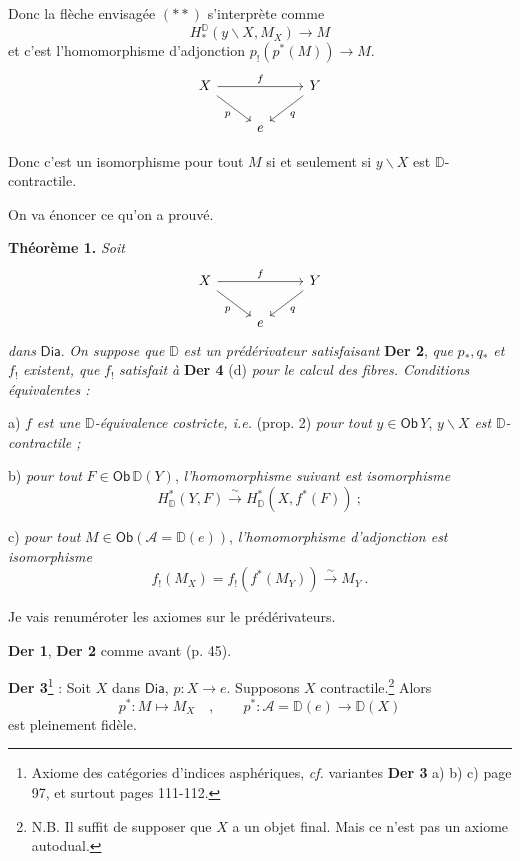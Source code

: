 \documentclass[11pt]{article}
\newcommand{\printedpage}[1]{\marginpar{\footnotesize p.~#1}}
\newcommand{\msp}[1]{\marginpar{\footnotesize [#1]}}
\newcommand{\D}{\mathbb{D}}
\newcommand{\Dia}{\mathsf{Dia}}
\newcommand{\Ob}{\mathsf{Ob}}
\newcommand{\isoto}{\overset{\sim}{\longrightarrow}}
\begin{document}
\printedpage{39}
\msp{page 67}

\noindent Donc la flèche envisagée $(**)$ s'interprète comme
\[
H_*^{\D}(y\backslash X, M_X) \longrightarrow M
\]
et c'est l'homomorphisme d'adjonction $p_!(p^*(M)) \to M$.
\[
\begin{tikzcd}
X \arrow[rr, "f"] \arrow[dr, "p"{swap}] & & Y \arrow[dl, "q"] \\
& e &
\end{tikzcd}
\]

\noindent Donc c'est un isomorphisme pour tout $M$ si et seulement si $y\backslash X$ est $\D$-contractile.

\noindent On va énoncer ce qu'on a prouvé.

\noindent\textbf{Théorème 1.} \textit{Soit}
\[
\begin{tikzcd}
X \arrow[rr, "f"] \arrow[dr, "p"{swap}] & & Y \arrow[dl, "q"] \\
& e &
\end{tikzcd}
\]
\textit{dans} $\Dia$. \textit{On suppose que} $\D$ \textit{est un prédérivateur satisfaisant} \textbf{Der 2}, \textit{que} $p_*, q_*$ \textit{et} $f_!$ \textit{existent, que} $f_!$ \textit{satisfait à} \textbf{Der 4} (d) \textit{pour le calcul des fibres. Conditions équivalentes :}

a) $f$ \textit{est une} $\D$\textit{-équivalence costricte, i.e.} (prop. 2) \textit{pour tout} $y \in \Ob\, Y$, $y\backslash X$ \textit{est} $\D$\textit{-contractile ;}

b) \textit{pour tout} $F \in \Ob\, \D(Y)$, \textit{l'homomorphisme suivant est} \textit{isomorphisme}
\[
H^*_{\D}(Y, F) \isoto H^*_{\D}(X, f^*(F)) \ ;
\]

c) \textit{pour tout} $M \in \Ob(\mathcal{A} = \D(e))$, \textit{l'homomorphisme d'adjonction est} \textit{isomorphisme}
\[
f_!(M_X) = f_!(f^*(M_Y)) \isoto M_Y \ .
\]

Je vais renuméroter les axiomes sur le prédérivateurs. %

\noindent\textbf{Der 1}, \textbf{Der 2} comme avant (p. 45).

\noindent\textbf{Der 3}\footnote[28]{Axiome des catégories d'indices asphériques, \textit{cf.} variantes \textbf{Der 3} a) b) c) page 97, et surtout pages 111-112.} : Soit $X$ dans $\Dia$, $p : X \to e$. Supposons $X$ contractile.\footnote[29]{N.B. Il suffit de supposer que $X$ a un objet final. Mais ce n'est pas un axiome autodual.} Alors
\[
p^* : M \longmapsto M_X \quad , \qquad p^* : \mathcal{A} = \D(e) \longrightarrow \D(X)
\]
est pleinement fidèle.
\end{document}
